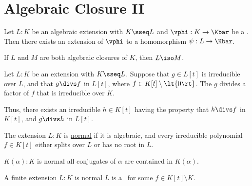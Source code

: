 \documentclass[a4paper]{article}
\begin{document}
\section{Algebraic Closure II}
\begin{ttheorem}
  Let \( L:K \) be an algebraic extension with \( K\sseq L \) and \( \vphi:K\to\Kbar \) be a \homo.
  Then there exists an extension of \( \vphi \) to a homomorphism \( \psi:L\to\Kbar \).
\end{ttheorem}

\begin{ttheorem}
  If \( L \) and \( M \) are both algebraic closures of \( K \), then \( L \iso M \).
\end{ttheorem}

\begin{tcorollary}
  Let \( L:K \) be an extension with \( K\sseq L \).
  Suppose that \( g\in L[t] \) is irreducible over \( L \), and that \( g\divs f \) in \( L[t] \), where \( f\in K[t]\setminus \lt\{ 0 \rt\} \).
  The \( g \) divides a factor of \( f \) that is irreducible over \( K \).

  Thus, there exists an irreducible \( h\in K[t] \) having the property that \( h\divs f \) in \( K[t] \), and \( g\divs h \) in \( L[t] \).
\end{tcorollary}

\begin{tdefinition}
  The extension \( L:K \) is \ul{normal} if it is algebraic, and every irreducible polynomial \( f\in K[t] \) either splits over \( L \) or has no root in \( L \).
\end{tdefinition}

\begin{ttheorem}
  \( K(\alpha):K \) is normal \iff all conjugates of \( \alpha \) are contained in \( K(\alpha) \).
\end{ttheorem}

\begin{ttheorem}
  A finite extension \( L:K \) is normal \iff \( L \) is a \sfe~for some \( f\in K[t]\setminus K \).
\end{ttheorem}
\end{document}
